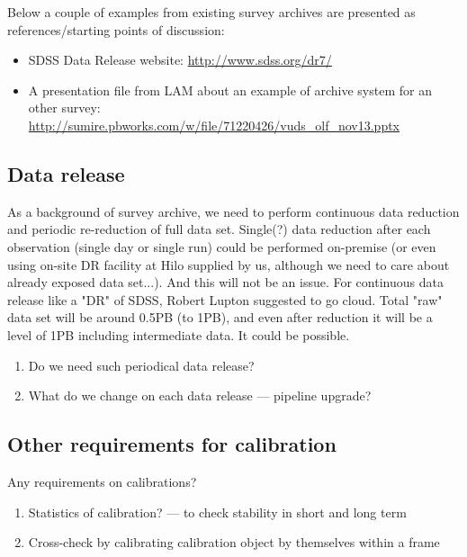 \documentclass[a4paper,notitlepage]{article}
\begin{document}
Below a couple of examples from existing survey archives are presented
as references/starting points of discussion:
\begin{itemize}
 \item SDSS Data Release website: \url{http://www.sdss.org/dr7/}
 \item A presentation file from LAM about an example of archive system
       for an other survey: 
       \url{http://sumire.pbworks.com/w/file/71220426/vuds_olf_nov13.pptx}
\end{itemize}

\subsection{Data release}

As a background of survey archive, we need to perform continuous data
reduction and periodic re-reduction of full data set.  Single(?) data
reduction after each observation (single day or single run) could be
performed on-premise (or even using on-site DR facility at Hilo supplied
by us, although we need to care about already exposed data set...).  And
this will not be an issue. For continuous data release like a "DR" of
SDSS, Robert Lupton suggested to go cloud. Total "raw" data set will be
around 0.5PB (to 1PB), and even after reduction it will be a level of
1PB including intermediate data.  It could be possible.

\begin{enumerate}
  \item[\cols{a}] Do we need such periodical data release?
  \item[\colm{b}] What do we change on each data release --- pipeline upgrade?
\end{enumerate}


\subsection{Other requirements for calibration}

Any requirements on calibrations?

\begin{enumerate}
  \item[\colm{a}] Statistics of calibration? --- to check stability in short and long 
    term
  \item[\colm{b}] Cross-check by calibrating calibration object by themselves within a 
    frame
\end{enumerate}
\end{document}
